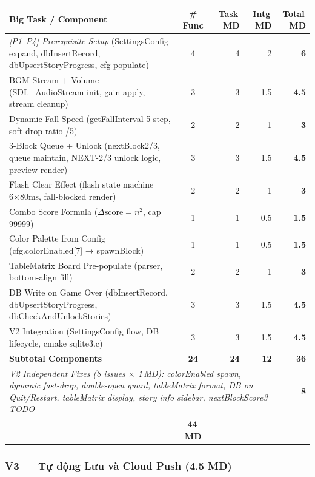 \documentclass[12pt,a4paper]{article}
\begin{document}
\begin{tabularx}{\linewidth}{|X|c|r|r|r|}
\hline
\rowcolor{coreViolet!18}
\textbf{Big Task / Component} & \textbf{\# Func} & \textbf{Task\,MD} & \textbf{Intg\,MD} & \textbf{Total\,MD} \\
\hline
\rowcolor{rowLight}
\textit{[P1--P4] Prerequisite Setup} (SettingsConfig expand, dbInsertRecord, dbUpsertStoryProgress, cfg populate) & 4 & 4 & 2 & \textbf{6} \\
BGM Stream + Volume (SDL\_AudioStream init, gain apply, stream cleanup) & 3 & 3 & 1.5 & \textbf{4.5} \\
\rowcolor{rowLight}
Dynamic Fall Speed (getFallInterval 5-step, soft-drop ratio /5) & 2 & 2
& 1 & \textbf{3} \\
3-Block Queue + Unlock (nextBlock2/3, queue maintain, NEXT-2/3 unlock logic, preview render) & 3 & 3 & 1.5 & \textbf{4.5} \\
\rowcolor{rowLight}
Flash Clear Effect (flash state machine 6×80ms, fall-blocked render) & 2 & 2 & 1 & \textbf{3} \\
Combo Score Formula ($\Delta\text{score} = n^2$, cap 99999) & 1 & 1 & 0.5 & \textbf{1.5} \\
\rowcolor{rowLight}
Color Palette from Config (cfg.colorEnabled[7] → spawnBlock) & 1 & 1 & 0.5 & \textbf{1.5} \\
TableMatrix Board Pre-populate (parser, bottom-align fill) & 2 & 2 & 1 & \textbf{3} \\
\rowcolor{rowLight}
DB Write on Game Over (dbInsertRecord, dbUpsertStoryProgress, dbCheckAndUnlockStories) & 3 & 3 & 1.5
& \textbf{4.5} \\
V2 Integration (SettingsConfig flow, DB lifecycle, cmake sqlite3.c) & 3 & 3 & 1.5 & \textbf{4.5} \\
\hline
\rowcolor{coreViolet!12}
\textbf{Subtotal Components} & \textbf{24} & \textbf{24} & \textbf{12} & \textbf{36} \\
\hline
\multicolumn{4}{|p{0.82\linewidth}|}{\raggedright \textit{V2 Independent Fixes (8 issues $\times$ 1\,MD): colorEnabled spawn, dynamic fast-drop, double-open guard, tableMatrix format, DB on Quit/Restart, tableMatrix display, story info sidebar, nextBlockScore3 TODO}} & \textbf{8} \\
\hline
\rowcolor{v2amber!15}
\multicolumn{4}{|l|}{\textbf{V2 Grand Total}} & \textbf{44\,MD} \\
\hline
\end{tabularx}

\subsubsection{V3 — Tự động Lưu và Cloud Push (4.5 MD)}
\end{document}
